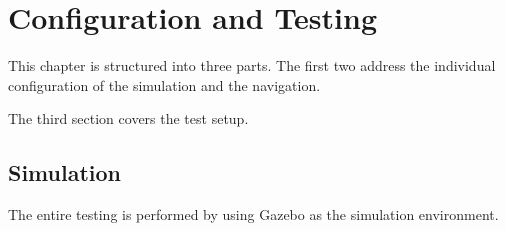 \chapter{Configuration and Testing}
\label{configurationandtesting}

This chapter is structured into three parts. The first two address the individual configuration of the simulation and the navigation.

The third section covers the test setup.

\section{Simulation}
The entire testing is performed by using Gazebo as the simulation environment. 





